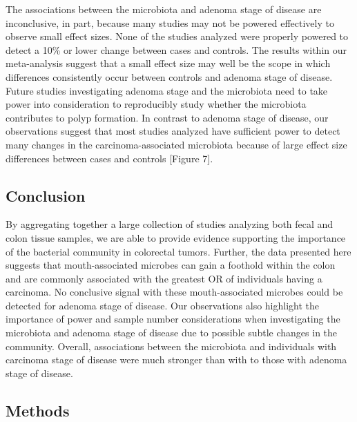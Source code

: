 \documentclass[12pt,]{article}
\begin{document}
The associations between the microbiota and adenoma stage of disease are
inconclusive, in part, because many studies may not be powered
effectively to observe small effect sizes. None of the studies analyzed
were properly powered to detect a 10\% or lower change between cases and
controls. The results within our meta-analysis suggest that a small
effect size may well be the scope in which differences consistently
occur between controls and adenoma stage of disease. Future studies
investigating adenoma stage and the microbiota need to take power into
consideration to reproducibly study whether the microbiota contributes
to polyp formation. In contrast to adenoma stage of disease, our
observations suggest that most studies analyzed have sufficient power to
detect many changes in the carcinoma-associated microbiota because of
large effect size differences between cases and controls {[}Figure 7{]}.

\newpage

\subsection{Conclusion}\label{conclusion}

By aggregating together a large collection of studies analyzing both
fecal and colon tissue samples, we are able to provide evidence
supporting the importance of the bacterial community in colorectal
tumors. Further, the data presented here suggests that mouth-associated
microbes can gain a foothold within the colon and are commonly
associated with the greatest OR of individuals having a carcinoma. No
conclusive signal with these mouth-associated microbes could be detected
for adenoma stage of disease. Our observations also highlight the
importance of power and sample number considerations when investigating
the microbiota and adenoma stage of disease due to possible subtle
changes in the community. Overall, associations between the microbiota
and individuals with carcinoma stage of disease were much stronger than
with to those with adenoma stage of disease.

\newpage

\subsection{Methods}\label{methods}
\end{document}
